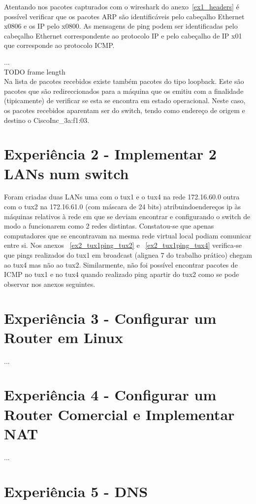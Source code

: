\documentclass[11pt,a4paper,reqno]{report}
\numberwithin{equation}{section}
\begin{document}
Atentando nos pacotes capturados com o wireshark do anexo~\ref{ex1_headers} é possível verificar que os pacotes ARP são identificáveis pelo cabeçalho Ethernet x0806 e os IP pelo x0800. As mensagens de ping podem ser identificadas pelo cabeçalho Ethernet correspondente ao protocolo IP e pelo cabeçalho de IP x01 que corresponde ao protocolo ICMP.

...\\ TODO frame length \\

Na lista de pacotes recebidos existe também pacotes do tipo loopback. Este são pacotes que são redireccionados para a máquina que os emitiu com a finalidade (tipicamente) de verificar se esta se encontra em estado operacional. Neste caso, os pacotes recebidos aparentam ser do switch, tendo como endereço de origem e destino o CiscoInc\_3a:f1:03.

\section{Experiência 2 - Implementar 2 LANs num switch}

Foram criadas duas LANs uma com o tux1 e o tux4 na rede 172.16.60.0 outra com o tux2 na 172.16.61.0 (com máscara de 24 bits) atribuindoendereços  ip às máquinas relativos à rede em que se deviam encontrar e configurando o switch de modo a funcionarem como 2 redes distintas. Constatou-se que apenas  computadores que se encontravam na mesma rede virtual local podiam comunicar entre si. Nos anexos ~\ref{ex2_tux1ping_tux2} e ~\ref{ex2_tux1ping_tux4} verifica-se que pings realizados do tux1 em broadcast (alignea 7 do trabalho prático) chegam ao tux4 mas não ao tux2. Similarmente, não foi possível encontrar pacotes de ICMP no tux1 e no tux4 quando realizado ping apartir do tux2 como se pode observar nos anexos seguintes.


\section{Experiência 3 - Configurar um Router em Linux}
...
\section{Experiência 4 - Configurar um Router Comercial e Implementar NAT}
...
\section{Experiência 5 - DNS}
\end{document}
